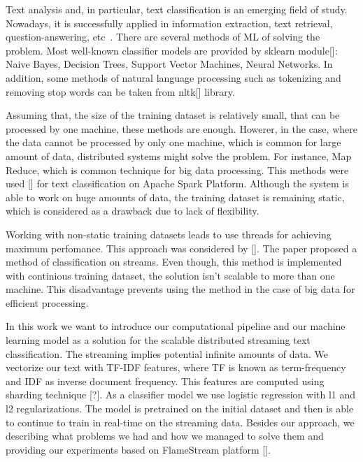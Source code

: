 \label {fs-short-intro}



Text analysis and, in particular, text classification is an emerging field of study. Nowadays, it is successfully applied in information extraction, text retrieval, question-answering, etc~\cite{tampakas2005}. There are several methods of ML of solving the problem. Most well-known classifier models are provided by sklearn module[]: Naive Bayes, Decision Trees, Support Vector Machines, Neural Networks. In addition, some methods of natural language processing such as tokenizing and removing stop words can be taken from nltk[] library. 

Assuming that, the size of the training dataset is relatively small, that can be processed by one machine, these methods are enough. Howerer, in the case, where the data cannot be processed by only one machine, which is common for large amount of data, distributed systems might solve the problem. For instance, Map Reduce, which is common technique for big data processing. This methods were used [] for text classification on Apache Spark Platform. Although the system is able to work on huge amounts of data, the training dataset is remaining static, which is considered as a drawback due to lack of flexibility.

Working with non-static training datasets leads to use threads for achieving maximum perfomance. This approach was considered by []. The paper proposed a method of classification on streams. Even though, this method is implemented with continious training dataset, the solution isn't scalable to more than one machine. This disadvantage prevents using the method in the case of big data for efficient processing.

In this work we want to introduce our computational pipeline and our machine learning model as a solution for the scalable distributed streaming text classification. The streaming implies potential infinite amounts of data. We vectorize our text with TF-IDF features, where TF is known as term-frequency and IDF as inverse document frequency. This features are computed using sharding technique [?]. As a classifier model we use logistic regression with l1 and l2 regularizations. The model is pretrained on the initial dataset and then is able to continue to train in real-time on the streaming data. Besides our approach, we describing what problems we had and how we managed to solve them and providing our experiments based on FlameStream platform [].

